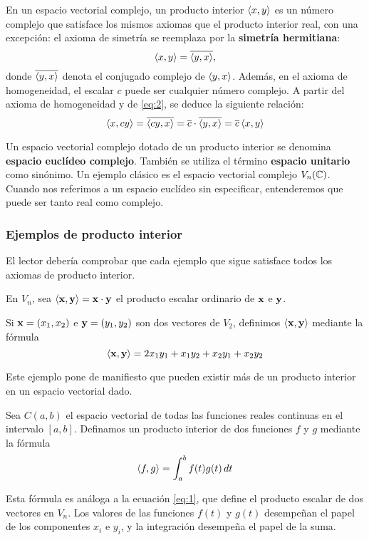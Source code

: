 \documentclass[a4paper,12pt]{article}
\begin{document}
En un espacio vectorial complejo, un producto interior $\left\langle x,y\right\rangle$ es un número complejo que satisface los mismos axiomas que el producto interior real, con una excepción: el axioma de simetría se reemplaza por la \textbf{simetría hermitiana}:
\begin{equation}\label{eq:2}
    \left\langle x,y\right\rangle = \overline{\left\langle y,x\right\rangle},
\end{equation}
donde $\overline{\left\langle y,x\right\rangle}$ denota el conjugado complejo de $\left\langle y,x\right\rangle$. Además, en el axioma de homogeneidad, el escalar $c$ puede ser cualquier número complejo. A partir del axioma de homogeneidad y de \eqref{eq:2}, se deduce la siguiente relación:
$$\left\langle x,cy\right\rangle = \overline{\left\langle cy,x\right\rangle} = \overline{c} \cdot \overline{\left\langle y,x\right\rangle} = \overline{c} \left\langle x,y\right\rangle$$

Un espacio vectorial complejo dotado de un producto interior se denomina \textbf{espacio euclídeo complejo}. También se utiliza el término \textbf{espacio unitario} como sinónimo. Un ejemplo clásico es el espacio vectorial complejo $V_n(\mathbb{C})$. Cuando nos referimos a un espacio euclídeo sin especificar, entenderemos que puede ser tanto real como complejo.

\subsubsection*{Ejemplos de producto interior}
El lector debería comprobar que cada ejemplo que sigue satisface todos los axiomas de producto interior.

\begin{example}
    En $V_n$, sea $\left\langle \mathbf{x},\mathbf{y}\right\rangle = \mathbf{x} \cdot \mathbf{y}$ el producto escalar ordinario de $\mathbf{x}$ e $\mathbf{y}$.
\end{example}

\begin{example}
    Si $\mathbf{x} = (x_1, x_2)$ e $\mathbf{y} = (y_1, y_2)$ son dos vectores de $V_2$, definimos $\left\langle \mathbf{x},\mathbf{y}\right\rangle$ mediante la fórmula
    $$\left\langle \mathbf{x},\mathbf{y}\right\rangle = 2x_1y_1 + x_1y_2 + x_2y_1 + x_2y_2$$

    Este ejemplo pone de manifiesto que pueden existir más de un producto interior en un espacio vectorial dado.
\end{example}

\begin{example}
    Sea $C(a, b)$ el espacio vectorial de todas las funciones reales continuas en el intervalo $[a, b]$. Definamos un producto interior de dos funciones $f$ y $g$ mediante la fórmula
    $$\left\langle f,g\right\rangle = \int_a^b f(t) g(t) \, dt$$

    Esta fórmula es análoga a la ecuación \eqref{eq:1}, que define el producto escalar de dos vectores en $V_n$. Los valores de las funciones $f(t)$ y $g(t)$ desempeñan el papel de los componentes $x_i$ e $y_i$, y la integración desempeña el papel de la suma.
\end{example}
\end{document}
